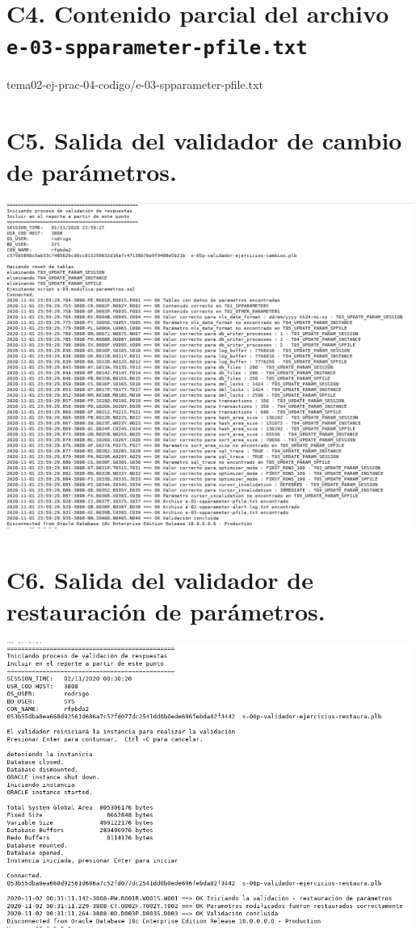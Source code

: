 \documentclass{article}
\begin{document}
\section*{C4. Contenido parcial del archivo \texttt{e-03-spparameter-pfile.txt}}

    {tema02-ej-prac-04-codigo/e-03-spparameter-pfile.txt}
\section*{C5. Salida del validador de cambio de parámetros.}
\includegraphics[width=\linewidth]{tema02-ej-prac-04-part01-validador.png}
\section*{C6. Salida del validador de restauración de parámetros.}
\includegraphics[width=\linewidth]{tema02-ej-prac-04-part02-validador.png}
\end{document}

